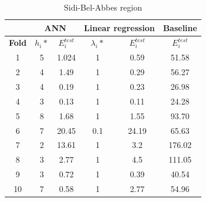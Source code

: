 \documentclass[10pt]{article}
\numberwithin{equation}{section}
\numberwithin{figure}{section}
\numberwithin{table}{section}
\begin{document}
\begin{table}[H]
\centering
\begin{tabular}{c|c|c|c|c|c|}
\cline{2-6}
\multicolumn{1}{l|}{\textbf{}}      & \multicolumn{2}{c|}{\textbf{ANN}}       & \multicolumn{2}{c|}{\textbf{Linear regression}} & \textbf{Baseline}     \\ \hline
\multicolumn{1}{|c|}{\textbf{Fold}} & \textbf{$h_i*$} & \textbf{$E_i^{test}$} & \textbf{$\lambda_i*$}  & \textbf{$E_i^{test}$}  & \textbf{$E_i^{test}$} \\ \hline
\multicolumn{1}{|c|}{1}             & 5               & 1.024                 & 1                    & 0.59                  & 51.58                  \\ \hline
\multicolumn{1}{|c|}{2}             & 4               & 1.49                   & 1                   & 0.29                   & 56.27                  \\ \hline
\multicolumn{1}{|c|}{3}             & 4               & 0.19                 & 1                     & 0.23                     & 26.98                  \\ \hline
\multicolumn{1}{|c|}{4}             & 3               & 0.13                  & 1                   & 0.11                     & 24.28                  \\ \hline
\multicolumn{1}{|c|}{5}             & 8               & 1.68                  & 1                    & 1.55                  & 93.70                  \\ \hline

\multicolumn{1}{|c|}{6}             & 7               & 20.45                  & 0.1                    & 24.19                   & 65.63                  \\ \hline

\multicolumn{1}{|c|}{7}             & 2               & 13.61                  & 1                    & 3.2                   & 176.02                  \\ \hline

\multicolumn{1}{|c|}{8}             & 3               & 2.77                  & 1                    & 4.5                   & 111.05                  \\ \hline

\multicolumn{1}{|c|}{9}             & 3               & 0.72                  & 1                    & 0.39                   & 40.54                  \\ \hline

\multicolumn{1}{|c|}{10}             & 7               & 0.58                  & 1                    & 2.77                   & 54.96                  \\ \hline
\end{tabular}
\caption{Sidi-Bel-Abbes region}
\label{SidiCross}
\end{table}
\end{document}
